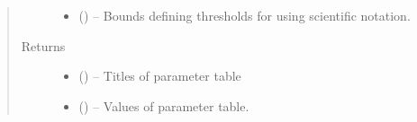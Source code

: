 \documentclass[letterpaper,10pt,english]{sphinxmanual}
\begin{document}
\begin{fulllineitems}
\begin{quote}
\begin{description}
\begin{itemize}
\item {} 
\sphinxAtStartPar
{} (\sphinxstyleliteralemphasis{\sphinxupquote{(}}\sphinxstyleliteralemphasis{\sphinxupquote{, }}) – Bounds defining thresholds for using scientific notation.

\end{itemize}

\item[{Returns}] \leavevmode
\sphinxAtStartPar
\begin{itemize}
\item {} 
\sphinxAtStartPar
{} () – Titles of parameter table

\item {} 
\sphinxAtStartPar
{} () – Values of parameter table.

\end{itemize}


\end{description}\end{quote}

\end{fulllineitems}

\end{document}
